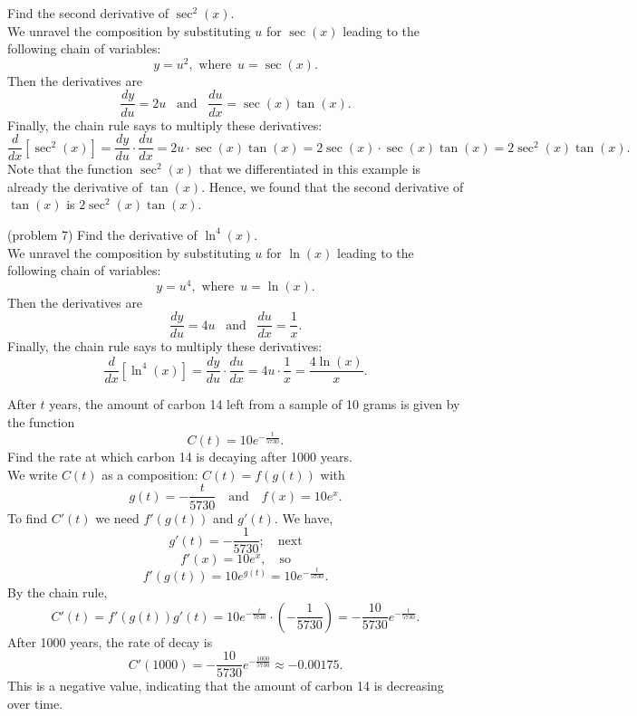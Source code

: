\documentclass[handout]{ximera}
\begin{document}
\begin{example}[example 7]
Find the second derivative of $\sec^2(x)$.\\
We unravel the composition by substituting $u$ for $\sec(x)$ leading to the following chain of variables:
\[
y = u^2,  \text{ where } \, u = \sec(x).
\]
Then the derivatives are
\[
\frac{dy}{du} = 2u  \,\,\,\text{  and  }  \,\,\,\frac{du}{dx} = \sec(x)\tan(x).
\]
Finally, the chain rule says to multiply these derivatives:
\[
\frac{d}{dx}\left[\sec^2(x)\right] = \frac{dy}{du} \cdot \frac{du}{dx} = 2u \cdot 
\sec(x)\tan(x) = 2\sec(x) \cdot \sec(x)\tan(x) = 2\sec^2(x)\tan(x).
\]
Note that the function $\sec^2(x)$ that we differentiated in this example is already the derivative of $\tan(x)$.
Hence, we found that the second derivative of $\tan(x)$ is $2\sec^2(x)\tan(x)$.
\end{example}

\begin{problem}(problem 7)
  Find the derivative of $\ln^4(x)$.\\
  We unravel the composition by substituting $u$ for $\ln(x)$ leading to the following chain of variables:
\[
y = u^4,  \text{ where } \, u = \ln(x).
\]
Then the derivatives are
\[
\frac{dy}{du} = 4u  \,\,\,\text{  and  }  \,\,\,\frac{du}{dx} = \frac{1}{x}.
\]
Finally, the chain rule says to multiply these derivatives:
\[
\frac{d}{dx}\left[\ln^4(x)\right] = \frac{dy}{du} \cdot \frac{du}{dx} = 4u \cdot \frac{1}{x} = \frac{4\ln(x)}{x}.
\]
\end{problem}

\begin{example}[example 8]
After $t$ years, the amount of carbon 14 left from a sample of 10 grams is given by the function
\[
C(t) = 10e^{-\frac{t}{5730}}.
\]
Find the rate at which carbon 14 is decaying after 1000 years.\\
We write $C(t)$ as a composition: $C(t) = f(g(t))$ with
\[
g(t) = -\frac{t}{5730}  \quad \text{and} \quad  f(x) = 10e^x.
\]
To find $C'(t)$ we need $f'(g(t))$ and $g'(t)$. We have,
\[
g'(t) = -\frac{1}{5730}; \quad \text{next}
\]
\[
f'(x) = 10e^x, \quad \text{so}
\]
\[
f'(g(t))= 10e^{g(t)} = 10e^{-\frac{t}{5730}}.
\]
By the chain rule,
\[
C'(t) = f'(g(t))g'(t) = 10e^{-\frac{t}{5730}} \cdot \left(-\frac{1}{5730}\right) = -\frac{10}{5730}e^{-\frac{t}{5730}}.
\]
After 1000 years, the rate of decay is
\[
C'(1000) = -\frac{10}{5730}e^{-\frac{1000}{5730}} \approx -0.00175.
\]
This is a negative value, indicating that the amount of carbon 14 is decreasing over time.
\end{example}
\end{document}
